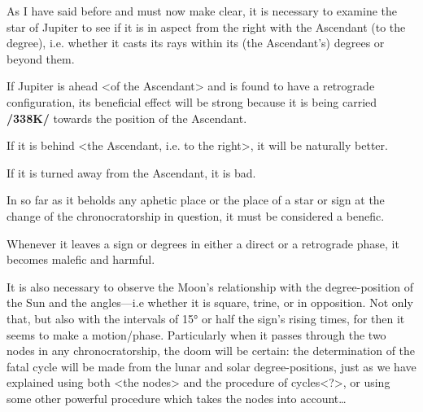 As I have said before and must now make clear, it is necessary to examine the star of Jupiter to see if it is in aspect from the right with the Ascendant (to the degree), i.e. whether it casts its rays within its (the Ascendant’s) degrees or beyond them. 

If Jupiter is ahead <of the Ascendant> and is found to have a retrograde configuration, its beneficial effect will be strong because it is being carried \textbf{/338K/} towards the position of the Ascendant. 

If it is behind <the Ascendant, i.e. to the right>, it will be naturally better. 

If it is turned away from the Ascendant, it is bad. 

In so far as it beholds any aphetic place or the place of a star or sign at the change of the chronocratorship in question, it must be considered a benefic. 

Whenever it leaves a sign or degrees in either a direct or a retrograde phase, it becomes malefic and harmful.

It is also necessary to observe the Moon’s relationship with the degree-position of the Sun and the angles—i.e whether it is square, trine, or in opposition. Not only that, but also with the intervals of 15° or half the sign's rising times, for then it seems to make a motion/phase. Particularly when it passes through the two nodes in any chronocratorship, the doom will be certain: the determination of the fatal cycle will be made from the lunar and solar degree-positions, just as we have explained using both <the nodes> and the procedure of cycles<?>, or using some other powerful procedure which takes the nodes into account…


\newpage